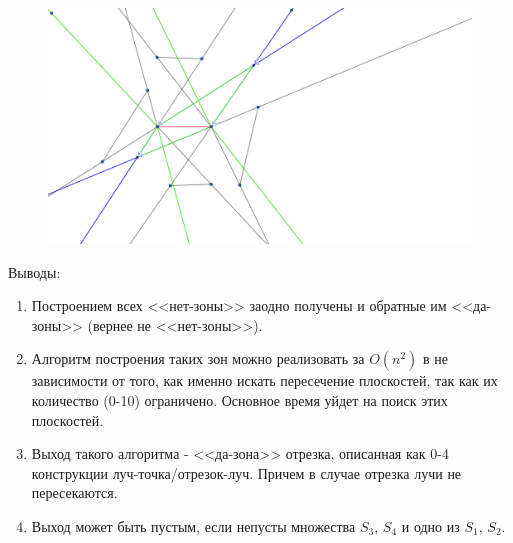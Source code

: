 \documentclass[letterpaper,12pt]{article}
\begin{document}
\begin{enumerate}
\begin{figure}[H]
            \end{figure}
            \begin{figure}[H]
                  \centering
                  \includegraphics[width=0.5\linewidth]{nozone_4_2.png}
            \end{figure}
\end{enumerate}
Выводы:
\begin{enumerate}
      \item Построением всех <<нет-зоны>> заодно получены и 
            обратные им <<да-зоны>> (вернее не <<нет-зоны>>).
      \item Алгоритм построения таких зон можно реализовать за
            $O(n^2)$ в не зависимости от того, как именно искать
            пересечение плоскостей, так как их количество (0-10)
            ограничено. Основное время уйдет на поиск этих
            плоскостей.
      \item Выход такого алгоритма - <<да-зона>> отрезка,
            описанная как 0-4 конструкции луч-точка/отрезок-луч.
            Причем в случае отрезка лучи не пересекаются.
      \item Выход может быть пустым, если непусты 
            множества $S_3$, $S_4$ и одно из $S_1$, $S_2$.
\end{enumerate}
\end{document}
